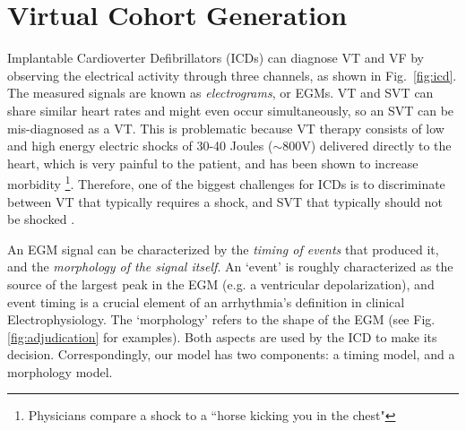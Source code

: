  \section{Virtual Cohort Generation}
 \label{sec:heart modeling}

Implantable Cardioverter Defibrillators (ICDs) can diagnose VT and VF by observing the electrical activity through three channels, as shown in Fig.~\ref{fig:icd}.
The measured signals are known as \emph{electrograms}, or EGMs.
VT and SVT can share similar heart rates and might even occur simultaneously, so an SVT can be mis-diagnosed as a VT. 
This is problematic because VT therapy consists of low and high energy electric shocks of 30-40 Joules ($\sim$800V) delivered directly to the heart, which is very painful to the patient, and has been shown to increase morbidity \cite{shock_mortality}\footnote{\small{Physicians compare a shock to a ``horse kicking you in the chest"}}.
Therefore, one of the biggest challenges for ICDs is to discriminate between VT that typically requires a shock, and SVT that typically should not be shocked \cite{Ellenbogen11_Pacingbook}.

An EGM signal can be characterized by the \emph{timing of events} that produced it, and the \emph{morphology of the signal itself}.
An `event' is roughly characterized as the source of the largest peak in the EGM (e.g. a ventricular depolarization), and event timing is a crucial element of an arrhythmia's definition in clinical Electrophysiology.
The `morphology' refers to the shape of the EGM (see Fig. \ref{fig:adjudication} for examples).
Both aspects are used by the ICD to make its decision.
Correspondingly, our model has two components: a timing model, and a morphology model.

